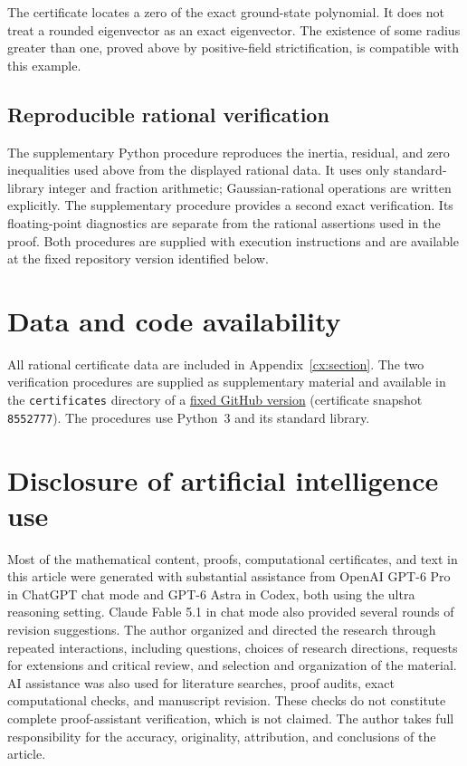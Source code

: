 \documentclass[reqno]{amsart}
\theoremstyle{definition}
\theoremstyle{remark}
\begin{document}
The certificate locates a zero of the exact ground-state polynomial.
It does not treat a rounded eigenvector as an exact eigenvector.
The existence of some radius greater than one, proved above by
positive-field strictification, is compatible with this example.

\subsection*{Reproducible rational verification}
The supplementary Python procedure
 reproduces the inertia, residual,
and zero inequalities used above from the displayed rational data.
It uses only standard-library integer and fraction arithmetic;
Gaussian-rational operations are written explicitly.
The supplementary procedure 
provides a second exact verification. Its floating-point diagnostics
are separate from the rational assertions used in the proof.
Both procedures are supplied with execution instructions and are
available at the fixed repository version identified below.


\section*{Data and code availability}
All rational certificate data are included in Appendix~\ref{cx:section}.
The two verification procedures are supplied as supplementary material
and available in the \texttt{certificates} directory of a
\href{https://github.com/Isaac-Wei-2026/stability-preserving-semigroups/tree/85527775f5de8af8911941fc422dbe140a63d11a/certificates}{fixed GitHub version}
(certificate snapshot \texttt{8552777}).
The procedures use Python~3 and its standard library.

\section*{Disclosure of artificial intelligence use}
Most of the mathematical content, proofs, computational certificates,
and text in this article were generated with substantial assistance from
OpenAI GPT-6 Pro in ChatGPT chat mode and GPT-6 Astra in Codex, both
using the ultra reasoning setting. Claude Fable 5.1 in chat mode also
provided several rounds of revision suggestions.
The author organized and directed the research through repeated
interactions, including questions, choices of research directions,
requests for extensions and critical review, and selection and
organization of the material. AI assistance was also used for
literature searches, proof audits, exact computational checks, and
manuscript revision. These checks do not constitute complete
proof-assistant verification, which is not claimed.
The author takes full responsibility for the accuracy, originality,
attribution, and conclusions of the article.
\end{document}

